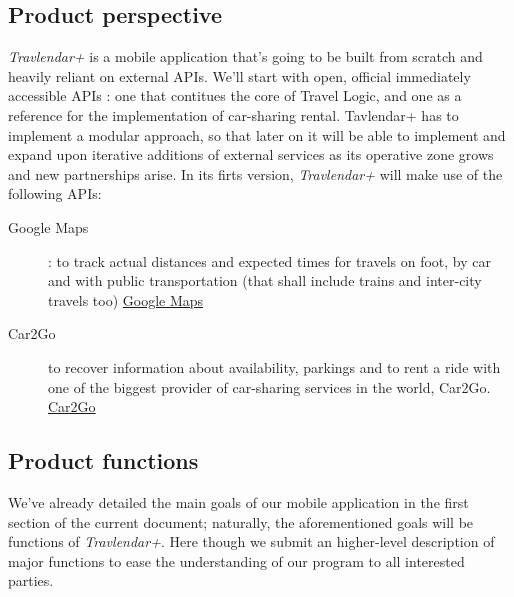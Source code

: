 \subsection{Product perspective}

\textit{Travlendar+} is a mobile application that’s going to be built from scratch and heavily reliant on external APIs. 
We’ll start with open, official immediately accessible APIs : one that contitues the core of Travel Logic, and one as a reference for the implementation of car-sharing rental. 
Tavlendar+ has to implement a modular approach, so that later on it will be able to implement and expand upon iterative additions of external services as its operative zone grows and new partnerships arise.
In its firts version, \textit{Travlendar+} will make use of the following APIs:
\begin{description}

	\item[Google Maps] : to track actual distances and expected times for travels on foot, by car and with public transportation (that shall include trains and inter-city travels too) 
	\href{https://developers.google.com/maps/}{Google Maps}
	\item[Car2Go] to recover information about availability, parkings and to rent a ride with one of the biggest provider of car-sharing services in the world, Car2Go.
	\href{https://github.com/car2go/openAPI}{Car2Go}


\end{description}


			
\subsection{Product functions}
	
 We’ve already detailed the main goals of our mobile application in the first section of the current document; naturally, the aforementioned goals will be functions of \textit{Travlendar+}.
Here though we submit an higher-level description of major functions to ease the understanding of our program to all interested parties.
		
